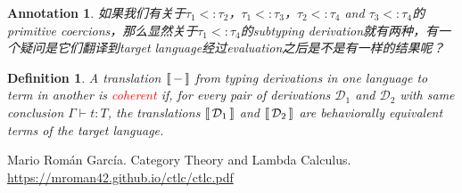 \documentclass{article}
\theoremstyle{plain}
\newtheorem{definition}[theorem]{Definition}
\newtheorem{annotation}[theorem]{Annotation}
\theoremstyle{nonumberplain}
\newcommand{\termtype}[2]{\ensuremath{#1:#2}}
\newcommand{\redt}[1]{\textcolor{red}{#1}}
\newcommand{\dbracket}[1]{\ensuremath{\left\llbracket\,\vcenter{\hbox{$#1$}}\,\right\rrbracket}}
\begin{document}
\begin{annotation}
\rm 如果我们有关于$\tau_1<:\tau_2$，$\tau_1 <: \tau_3$，$\tau_2<:\tau_4$ and $\tau_3<:\tau_4$的primitive coercions，那么显然关于$\tau_1 <: \tau_4$的subtyping derivation就有两种，有一个疑问是它们翻译到target language经过evaluation之后是不是有一样的结果呢？
\end{annotation}


\begin{definition}
\rm A translation $\dbracket{-}$ from typing derivations in one language to term in another is \redt{coherent} if, for every pair of derivations $\mathcal{D}_1$ and $\mathcal{D}_2$ with same conclusion $\Gamma \vdash \termtype{t}{T}$, the translations $\dbracket{\mathcal{D}_1}$ and $\dbracket{\mathcal{D}_2}$ are behaviorally equivalent terms of the target language.
\end{definition}

\newpage
\begin{thebibliography}{00}
 Mario Román García. Category Theory and Lambda Calculus. \url{https://mroman42.github.io/ctlc/ctlc.pdf}
\end{thebibliography}
\end{document}
